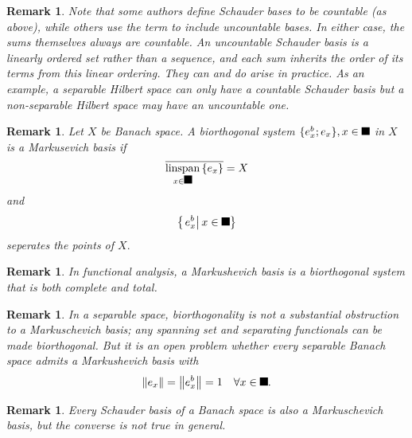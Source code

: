 \documentclass[aps,preprint]{revtex4}%
\providecommand{\U}[1]{\protect\rule{.1in}{.1in}}
\newtheorem{remark}[theorem]{Remark}
\begin{document}
\begin{remark}
Note that some authors define Schauder bases to be countable (as above), while
others use the term to include uncountable bases. In either case, the sums
themselves always are countable. An \emph{uncountable Schauder} basis is a
\emph{linearly ordered set} rather than a sequence, and each sum inherits the
order of its terms from this linear ordering. They can and do arise in
practice. As an example, a separable Hilbert space can only have a countable
Schauder basis but a non-separable Hilbert space may have an uncountable one.
\end{remark}

\begin{remark}
Let $X$ be Banach space. A biorthogonal system $\{e_{x}^{b};e_{x}%
\},x\in{\Large \U{3b1} }$ in $X$ is a Markusevich basis if
\begin{equation}
\overline{\operatorname*{linspan}_{x\in{\Large \U{3b1} }}\left\{
e_{x}\right\}  }=X
\end{equation}
and
\begin{equation}
\left\{  \left.  e_{x}^{b}\right\vert x\in{\Large \U{3b1} }\right\}
\end{equation}
seperates the points of $X.$
\end{remark}

\begin{remark}
In functional analysis, a \emph{Markushevich} basis is a biorthogonal system
that is both \emph{complete} and \emph{total}.
\end{remark}

\begin{remark}
In a separable space, biorthogonality is not a substantial obstruction to a
Markuschevich basis; any spanning set and separating functionals can be made
biorthogonal. But it is an open problem whether every separable Banach space
admits a Markushevich basis with%
\begin{equation}
\left\Vert e_{x}\right\Vert =\left\Vert e_{x}^{b}\right\Vert =1\quad\forall
x\in{\Large \U{3b1} }.
\end{equation}

\end{remark}

\begin{remark}
Every Schauder basis of a Banach space is also a Markuschevich basis, but the
converse is not true in general.
\end{remark}
\end{document}
